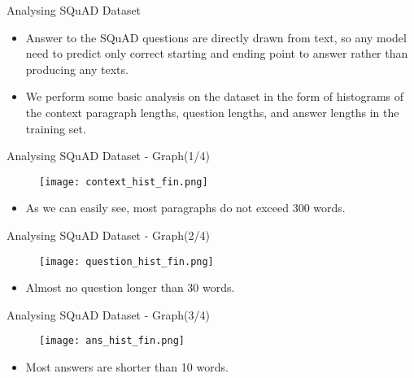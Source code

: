\documentclass[10pt]{beamer}
\begin{document}
\begin{frame}[fragile]{Analysing SQuAD Dataset}

	\begin{itemize}[<+- | alert@+>]
		\item Answer to the SQuAD questions are directly drawn from text, so any model need to predict only correct starting and ending point to answer rather than producing any texts.
		\item We perform some basic analysis on the dataset in the form of histograms
			of the context paragraph lengths,  question lengths,  and answer lengths in the training set.
	\end{itemize}
\end{frame}

\begin{frame}[fragile]{Analysing SQuAD Dataset - Graph(1/4)}

	\begin{figure}[H]
		\centering
		{\texttt{[image: context\_hist\_fin.png]}\label{fig:f1}}
	\end{figure}

	\begin{itemize}
		\item As we can easily see, most paragraphs do not exceed 300 words.
	\end{itemize}
\end{frame}

\begin{frame}[fragile]{Analysing SQuAD Dataset - Graph(2/4)}

	\begin{figure}[H]
		\centering
		{\texttt{[image: question\_hist\_fin.png]}\label{fig:f1}}
	\end{figure}

	\begin{itemize}
		\item Almost no question longer than 30 words.
	\end{itemize}
\end{frame}

\begin{frame}[fragile]{Analysing SQuAD Dataset - Graph(3/4)}

	\begin{figure}[H]
		\centering
		{\texttt{[image: ans\_hist\_fin.png]}\label{fig:f1}}
	\end{figure}

	\begin{itemize}
		\item Most answers
			are shorter than 10 words.
	\end{itemize}
\end{frame}
\end{document}
